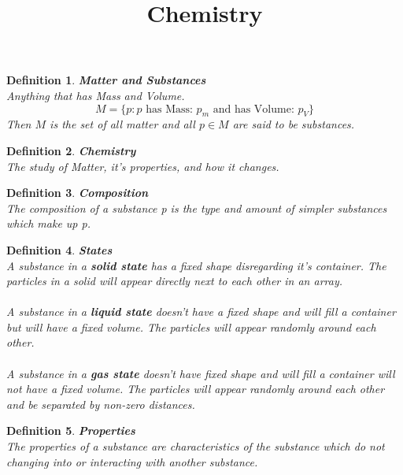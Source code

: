 \documentclass[12pt]{extarticle}
\title{Chemistry}
\theoremstyle{Definition}
\newtheorem{def.}{Definition}[section]
\begin{document}
\maketitle
\begin{def.} \textbf{Matter and Substances} \\ 
	Anything that has Mass and Volume. 
	$$M = \{p : p \text{ has Mass: } p_m \text{ and has Volume: } p_V\}$$ 
	Then $M$ is the set of all matter and all $p \in M$ are said to be substances. 
\end{def.}
\begin{def.} \textbf{Chemistry} \\
	The study of Matter, it's properties, and how it changes. 
\end{def.}
\begin{def.} \textbf{Composition} \\ 
	The composition of a substance p is the type and amount of simpler substances which make up p. 
\end{def.}
\begin{def.} \textbf{States} \\ 
	A substance in a \textbf{solid state} has a fixed shape disregarding it's container. The particles in a solid will appear directly next to each other in an array. \\ \\
	A substance in a \textbf{liquid state } doesn't have a fixed shape and will fill a container but will have a fixed volume. The particles will appear randomly around each other. \\ \\
	A substance in a \textbf{gas state} doesn't have fixed shape and will fill a container will not have a fixed volume. The particles will appear randomly around each other and be separated by non-zero distances. 
\end{def.}
\begin{def.}\textbf{Properties} \\ 
	The properties of a substance are characteristics of the substance which do not changing into or interacting with another substance. \\ 
\end{def.}
\newpage
\noindent
\end{document}

